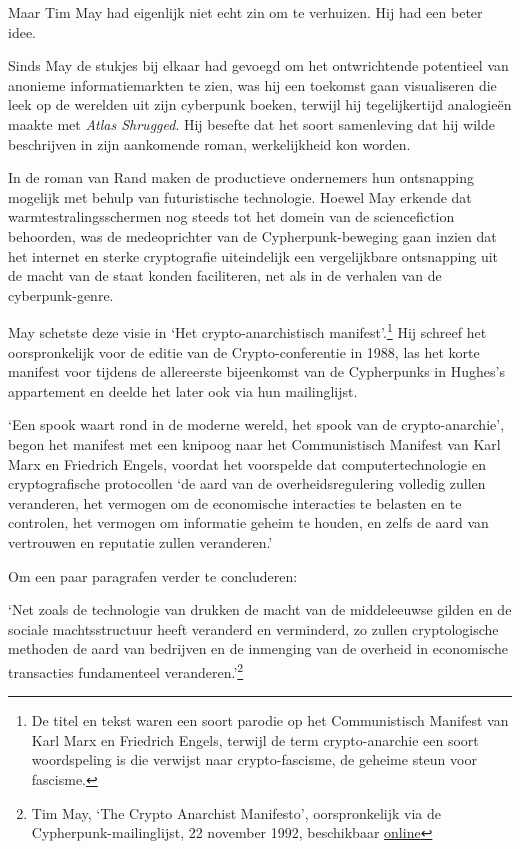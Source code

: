 \documentclass[smalldemyvopaper,11pt,twoside,onecolumn,openright,extrafontsizes,hidelinks]{memoir}
\begin{document}
Maar Tim May had eigenlijk niet echt zin om te verhuizen. Hij had een
beter idee.

Sinds May de stukjes bij elkaar had gevoegd om het ontwrichtende
potentieel van anonieme informatiemarkten te zien, was hij een toekomst
gaan visualiseren die leek op de werelden uit zijn cyberpunk boeken,
terwijl hij tegelijkertijd analogieën maakte met \emph{Atlas Shrugged}.
Hij besefte dat het soort samenleving dat hij wilde beschrijven in zijn
aankomende roman, werkelijkheid kon worden.

In de roman van Rand maken de productieve ondernemers hun ontsnapping
mogelijk met behulp van futuristische technologie. Hoewel May erkende
dat warmtestralingsschermen nog steeds tot het domein van de
sciencefiction behoorden, was de medeoprichter van de
Cypherpunk-beweging gaan inzien dat het internet en sterke cryptografie
uiteindelijk een vergelijkbare ontsnapping uit de macht van de staat
konden faciliteren, net als in de verhalen van de cyberpunk-genre.

May schetste deze visie in `Het crypto-anarchistisch
manifest'.\footnote{De titel en tekst waren een soort parodie op het
  Communistisch Manifest van Karl Marx en Friedrich Engels, terwijl de
  term crypto-anarchie een soort woordspeling is die verwijst naar
  crypto-fascisme, de geheime steun voor fascisme.} Hij schreef het
oorspronkelijk voor de editie van de Crypto-conferentie in 1988, las het
korte manifest voor tijdens de allereerste bijeenkomst van de
Cypherpunks in Hughes's appartement en deelde het later ook via hun
mailinglijst.

`Een spook waart rond in de moderne wereld, het spook van de
crypto-anarchie', begon het manifest met een knipoog naar het
Communistisch Manifest van Karl Marx en Friedrich Engels, voordat het
voorspelde dat computertechnologie en cryptografische protocollen `de
aard van de overheidsregulering volledig zullen veranderen, het vermogen
om de economische interacties te belasten en te controlen, het vermogen
om informatie geheim te houden, en zelfs de aard van vertrouwen en
reputatie zullen veranderen.'

Om een paar paragrafen verder te concluderen:

`Net zoals de technologie van drukken de macht van de middeleeuwse
gilden en de sociale machtsstructuur heeft veranderd en verminderd, zo
zullen cryptologische methoden de aard van bedrijven en de inmenging van
de overheid in economische transacties fundamenteel
veranderen.'\footnote{Tim May, `The Crypto Anarchist Manifesto',
  oorspronkelijk via de Cypherpunk-mailinglijst, 22 november 1992,
  beschikbaar
  \href{https://cypherpunks.venona.com/date/1992/11/msg00204.html}{online}}
\end{document}

